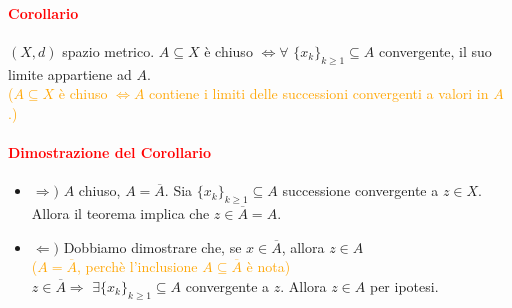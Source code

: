 \documentclass{article}
\begin{document}
\paragraph{\textcolor{red}{Corollario}}
$(X,d)$ spazio metrico. $A \subseteq X$ è chiuso $\Leftrightarrow \forall\,\, \{x_k\}_{k \geq 1} \subseteq A$ convergente, il suo limite appartiene ad $A$.\\
\textcolor{orange}{($A \subseteq X$ è chiuso $\Leftrightarrow A$ contiene i limiti delle successioni convergenti a valori in $A$.)}

\paragraph{\textcolor{red}{Dimostrazione del Corollario}}
\begin{itemize}
    \item $\Rightarrow)$ $A$ chiuso, $A = \overline{A}$. Sia $\{x_k\}_{k \geq 1} \subseteq A$ successione convergente a $z \in X$. Allora il teorema implica che $z \in \overline{A}= A$.
    \item $\Leftarrow ) $ Dobbiamo dimostrare che, se $x \in \overline{A}$, allora $z \in A$\\ \textcolor{orange}{($A=\overline{A}$, perchè l'inclusione $A \subseteq \overline{A}$ è nota)}\\
$z \in \overline{A} \Rightarrow \,\, \exists \{x_k\}_{k \geq 1} \subseteq A$ convergente a $z$. Allora $z \in A$ per ipotesi.
\end{itemize}
\begin{flushright}
\large\Lightning
\end{flushright}
\end{document}
